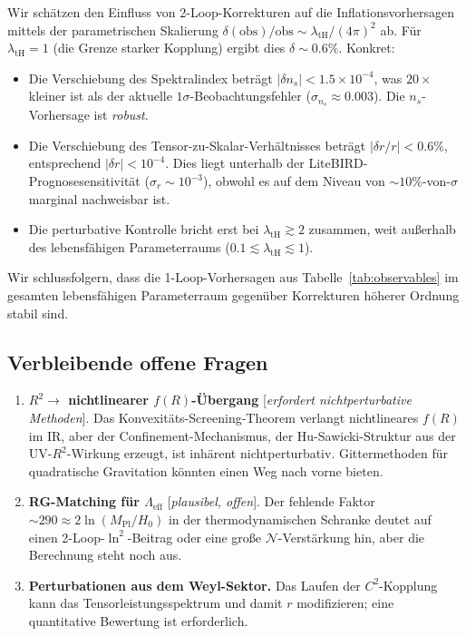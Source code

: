 \documentclass[aps,prd,twocolumn,superscriptaddress,nofootinbib]{revtex4-2}
\begin{document}
Wir schätzen den Einfluss von 2-Loop-Korrekturen auf die Inflationsvorhersagen mittels der parametrischen Skalierung $\delta(\mathrm{obs})/\mathrm{obs} \sim \lambda_\mathrm{tH}/(4\pi)^2$ ab. Für $\lambda_\mathrm{tH} = 1$ (die Grenze starker Kopplung) ergibt dies $\delta \sim 0.6\%$. Konkret:

\begin{itemize}
\item Die Verschiebung des Spektralindex beträgt $|\delta n_s| < 1.5 \times 10^{-4}$, was $20\times$ kleiner ist als der aktuelle $1\sigma$-Beobachtungsfehler ($\sigma_{n_s} \approx 0.003$). Die $n_s$-Vorhersage ist \textit{robust}.
\item Die Verschiebung des Tensor-zu-Skalar-Verhältnisses beträgt $|\delta r/r| < 0.6\%$, entsprechend $|\delta r| < 10^{-4}$. Dies liegt unterhalb der LiteBIRD-Prognosesensitivität ($\sigma_r \sim 10^{-3}$), obwohl es auf dem Niveau von $\sim 10\%$-von-$\sigma$ marginal nachweisbar ist.
\item Die perturbative Kontrolle bricht erst bei $\lambda_\mathrm{tH} \gtrsim 2$ zusammen, weit außerhalb des lebensfähigen Parameterraums ($0.1 \lesssim \lambda_\mathrm{tH} \lesssim 1$).
\end{itemize}

Wir schlussfolgern, dass die 1-Loop-Vorhersagen aus Tabelle~\ref{tab:observables} im gesamten lebensfähigen Parameterraum gegenüber Korrekturen höherer Ordnung stabil sind.

\subsection{Verbleibende offene Fragen}

\begin{enumerate}
\item \textbf{$R^2 \to$ nichtlinearer $f(R)$-Übergang} [\textit{erfordert nichtperturbative Methoden}]. Das Konvexitäts-Screening-Theorem verlangt nichtlineares $f(R)$ im IR, aber der Confinement-Mechanismus, der Hu-Sawicki-Struktur aus der UV-$R^2$-Wirkung erzeugt, ist inhärent nichtperturbativ. Gittermethoden für quadratische Gravitation könnten einen Weg nach vorne bieten.

\item \textbf{RG-Matching für $\Lambda_\mathrm{eff}$} [\textit{plausibel, offen}]. Der fehlende Faktor $\sim 290 \approx 2\ln(M_\mathrm{Pl}/H_0)$ in der thermodynamischen Schranke deutet auf einen 2-Loop-$\ln^2$-Beitrag oder eine große $\mathcal{N}$-Verstärkung hin, aber die Berechnung steht noch aus.

\item \textbf{Perturbationen aus dem Weyl-Sektor.} Das Laufen der $C^2$-Kopplung kann das Tensorleistungsspektrum und damit $r$ modifizieren; eine quantitative Bewertung ist erforderlich.
\end{enumerate}
\end{document}

